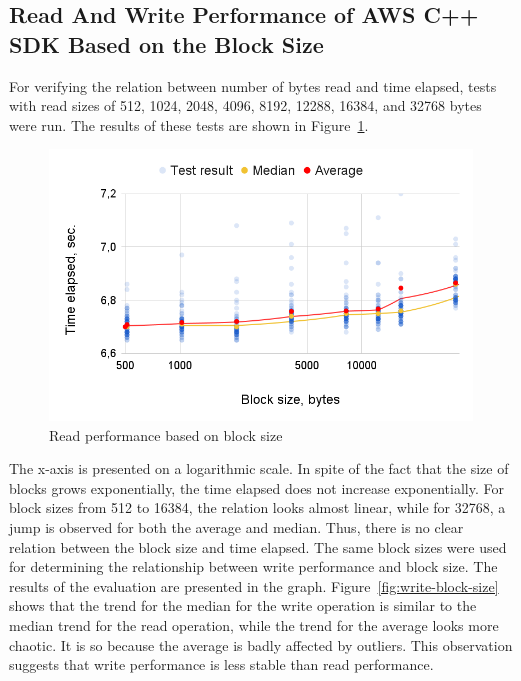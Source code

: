\documentclass[conference]{IEEEtran}
\begin{document}
\subsection{Read And Write Performance of AWS C++ SDK Based on the Block Size}
For verifying the relation between number of bytes read and time elapsed, tests with read sizes of 512, 1024, 2048, 4096, 8192, 12288, 16384, and 32768 bytes were run. The results of these tests are shown in Figure~\ref{fig:read-block-size}.
\begin{figure}
    \centering
    \includegraphics[width=0.9\linewidth]{read_bs.png}
    \caption{Read performance based on block size}
    \label{fig:read-block-size}
\end{figure}
The x-axis is presented on a logarithmic scale. In spite of the fact that the size of blocks grows exponentially, the time elapsed does not increase exponentially. For block sizes from 512 to 16384, the relation looks almost linear, while for 32768, a jump is observed for both the average and median. Thus, there is no clear relation between the block size and time elapsed. The same block sizes were used for determining the relationship between write performance and block size. The results of the evaluation are presented in the graph.
Figure~\ref{fig:write-block-size} shows that the trend for the median for the write operation is similar to the median trend for the read operation, while the trend for the average looks more chaotic. It is so because the average is badly affected by outliers. This observation suggests that write performance is less stable than read performance.
\end{document}
